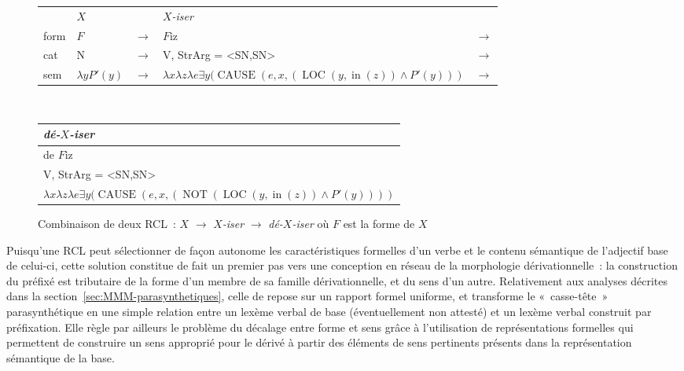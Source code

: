 \documentclass[output=paper]{langsci/langscibook}
\begin{document}
\begin{figure}

\begin{tabular}[t]{l|l|l|l|l}
\multicolumn{1}{l}{} &  \multicolumn{1}{l}{$X$} & \multicolumn{1}{l}{} & \multicolumn{1}{l}{\emph{$X$-iser}}\\
\cline{2-2}\cline{4-4}
form & $F$ &  $\rightarrow$ & $F$iz%
 &  $\rightarrow$\\
\cline{2-2}\cline{4-4}
cat & N & $\rightarrow$ & V, StrArg = <SN,SN> &  $\rightarrow$\\
\cline{2-2}\cline{4-4}
sem & $\lambda y P'(y)$ & $\rightarrow$ & $\lambda x \lambda z \lambda e \exists y (\operatorname{CAUSE} (e, x, (\operatorname{LOC}(y, \operatorname{in}(z)) \wedge P'(y)))$ & $\rightarrow$\\
\cline{2-2}\cline{4-4}
\end{tabular}\\
\mbox{}\hfill%
\begin{tabular}[t]{|l|}
 \multicolumn{1}{l}{\emph{dé-$X$-iser}}\\
\hline
de%
$F$iz%
\\
\hline
V, StrArg = <SN,SN>\\
\hline
$\lambda x \lambda z \lambda e \exists y (\operatorname{CAUSE} (e, x, (\operatorname{NOT}(\operatorname{LOC}(y, \operatorname{in}(z)) \wedge P'(y))))$\\
\hline
\end{tabular}

\caption{Combinaison de deux RCL~: \protect$X$\protect{} \protect$\rightarrow$ \emph{\mbox{\protect$X$-iser}}\protect{} \protect$\rightarrow$ \emph{\mbox{dé-\protect$X$-iser}}\protect{} où \protect$F$ est la forme de \protect$X$}
\label{fig:deXiser3}
\end{figure}

\newpage 
Puisqu'une RCL peut sélectionner de façon autonome les caractéristiques formelles d'un verbe et le contenu sémantique de l'adjectif base de celui-ci, cette solution constitue de fait un premier pas vers une conception en réseau de la morphologie dérivationnelle~: la construction du préfixé est tributaire de la forme d'un membre de sa famille dérivationnelle, et du sens d'un autre.  Relativement aux analyses décrites dans la section~\ref{sec:MMM-parasynthetiques}, celle de \citet{Fradin03} repose sur un rapport formel uniforme, et transforme le «~casse-tête~» parasynthétique en une simple relation entre un lexème verbal de base (éventuellement non attesté) et un lexème verbal construit par préfixation.  Elle règle par ailleurs le problème du décalage entre forme et sens grâce à l'utilisation de représentations formelles qui permettent de construire un sens approprié pour le dérivé à partir des éléments de sens pertinents présents dans la représentation sémantique de la base.
\end{document}
